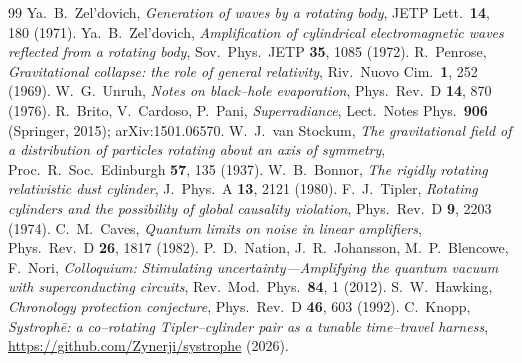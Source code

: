\documentclass[11pt]{article}
\begin{document}
\begin{thebibliography}{99}
 Ya.~B.~Zel'dovich, \emph{Generation of waves by a rotating body},
JETP Lett.\ \textbf{14}, 180 (1971).
 Ya.~B.~Zel'dovich, \emph{Amplification of cylindrical electromagnetic
waves reflected from a rotating body}, Sov.\ Phys.\ JETP \textbf{35}, 1085 (1972).
 R.~Penrose, \emph{Gravitational collapse: the role of general relativity},
Riv.\ Nuovo Cim.\ \textbf{1}, 252 (1969).
 W.~G.~Unruh, \emph{Notes on black--hole evaporation},
Phys.\ Rev.\ D \textbf{14}, 870 (1976).
 R.~Brito, V.~Cardoso, P.~Pani, \emph{Superradiance}, Lect.\ Notes Phys.\
\textbf{906} (Springer, 2015); arXiv:1501.06570.
 W.~J.~van Stockum, \emph{The gravitational field of a distribution of
particles rotating about an axis of symmetry}, Proc.\ R.\ Soc.\ Edinburgh \textbf{57}, 135 (1937).
\bibitem{bonnor1980} W.~B.~Bonnor, \emph{The rigidly rotating relativistic dust cylinder},
J.\ Phys.\ A \textbf{13}, 2121 (1980).
 F.~J.~Tipler, \emph{Rotating cylinders and the possibility of global
causality violation}, Phys.\ Rev.\ D \textbf{9}, 2203 (1974).
 C.~M.~Caves, \emph{Quantum limits on noise in linear amplifiers},
Phys.\ Rev.\ D \textbf{26}, 1817 (1982).
 P.~D.~Nation, J.~R.~Johansson, M.~P.~Blencowe, F.~Nori, \emph{Colloquium:
Stimulating uncertainty---Amplifying the quantum vacuum with superconducting circuits},
Rev.\ Mod.\ Phys.\ \textbf{84}, 1 (2012).
 S.~W.~Hawking, \emph{Chronology protection conjecture},
Phys.\ Rev.\ D \textbf{46}, 603 (1992).
 C.~Knopp, \emph{Systroph\=e: a co--rotating Tipler--cylinder pair as a tunable
time--travel harness}, \url{https://github.com/Zynerji/systrophe} (2026).
\end{thebibliography}
\end{document}
